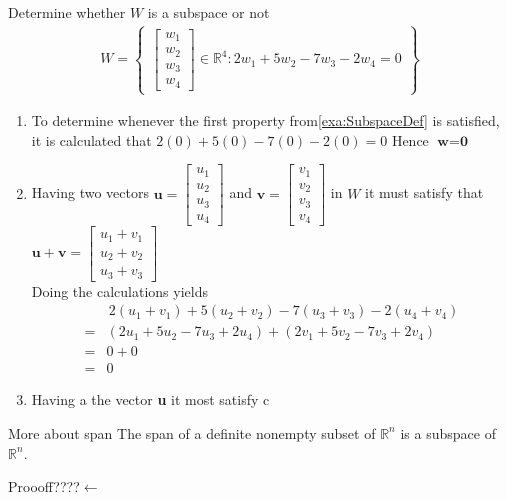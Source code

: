 \begin{example}{Determine whether $W$ is a subspace or not}
\begin{align*}
    W = \begin{Bmatrix}
    \begin{bmatrix}
    w_1\\w_2\\w_3\\w_4
    \end{bmatrix}
        \in \mathbb{R}^4: 2w_1 + 5w_2 - 7w_3 -2w_4 = 0 
    \end{Bmatrix}
\end{align*}
\begin{enumerate}
    \item To determine whenever the first property from\ref{exa:SubspaceDef} is satisfied, it is calculated that
    $2(0) + 5(0) - 7(0) -2(0) = 0 $ Hence $\textbf{w}=\textbf{0}$
    \item Having two vectors $\textbf{u}=\begin{bmatrix}
    u_1\\u_2\\u_3\\u_4\end{bmatrix}$ and $\textbf{v}=\begin{bmatrix}
    v_1\\v_2\\v_3\\v_4\end{bmatrix}$ in $W$ it must satisfy that $\textbf{u}+\textbf{v} = \begin{bmatrix}
    u_1 + v_1 \\ u_2 + v_2 \\ u_3 + v_3
    \end{bmatrix}$\\
    Doing the calculations yields
    \begin{align*}
        &\,2(u_1+v_1)+5(u_2+v_2)-7(u_3+v_3)-2(u_4+v_4)\\
        =& (2u_1+5u_2-7u_3+2u_4)+(2v_1+5v_2-7v_3+2v_4)\\ =& 0 + 0 \\=& 0
    \end{align*}
    \item Having a the vector \textbf{u} it most satisfy c
\end{enumerate}
\end{example}

\begin{theorem}{More about span}
The span of a definite nonempty subset of $\mathbb{R}^n$ is a subspace of $\mathbb{R}^n$.
\cite[231]{LiAl}
\end{theorem}
Proooff????$\leftarrow$

